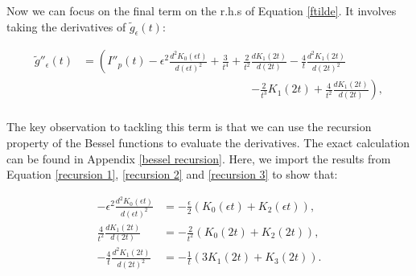 \documentclass{article}
\numberwithin{equation}{section} %
\begin{document}
Now we can focus on the final term on the r.h.s of Equation \ref{ftilde}. It involves taking the derivatives of $\tilde{g}_\epsilon(t)$:


\begin{equation}
\begin{split}
\tilde{g}''_\epsilon(t) &=\left(I''_p(t) - \epsilon^2\frac{d^2K_0(\epsilon t)}{d(\epsilon t)^2} + \frac{3}{t^4} + \frac{2}{t^2}\frac{dK_1(2t)}{d(2t)} - \frac{4}{t}\frac{d^2K_1(2t)}{d(2t)^2} \right.\\
& \quad \quad \quad \quad \quad \quad \quad \quad \quad \quad \quad \quad \quad \quad \quad  \left. - \frac{2}{t^3}K_1(2t) + \frac{4}{t^2}\frac{dK_1(2t)}{d(2t)}  \right),\\
\end{split}
\label{lim 3}
\end{equation}

\noindent The key observation to tackling this term is that we can use the recursion property of the Bessel functions to evaluate the derivatives\cite{bessel_recurrence}. The exact calculation can be found in Appendix \ref{bessel recursion}. Here, we import the results from Equation \ref{recursion 1}, \ref{recursion 2} and \ref{recursion 3} to show that:

\begin{equation}
\begin{split}
-\epsilon^2\frac{d^2K_0(\epsilon t)}{d(\epsilon t)^2} &= -\frac{\epsilon}{2}( K_0(\epsilon t) + K_2(\epsilon t)),\\
\frac{4}{t^2}\frac{dK_1(2t)}{d(2t)} &= -\frac{2}{t^2}(K_0(2t) + K_2(2t)),\\
-\frac{4}{t}\frac{d^2K_1(2t)}{d(2t)^2} &= -\frac{1}{t}(3K_1(2t) + K_3(2t)). 
\end{split}
\end{equation}
\end{document}
